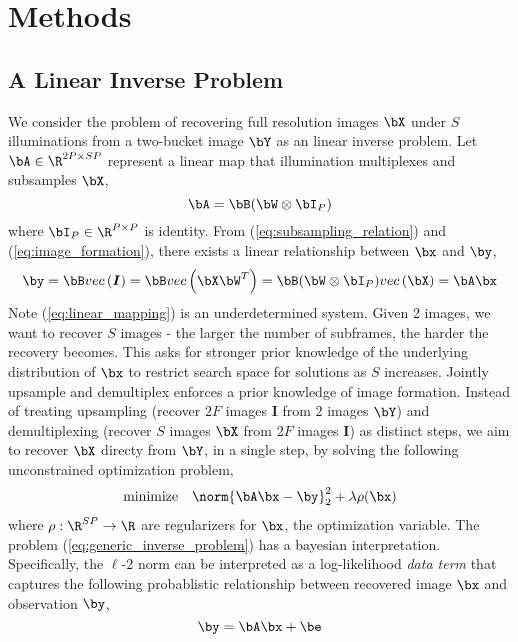 \documentclass[11pt]{article}
\renewcommand{\vec}[1]{vec\left(#1\right)}
\renewcommand{\sI}{\boldsymbol{I}}
\newcommand{\minimize}{\text{minimize}\quad}
\begin{document}
\section{Methods}

\subsection{A Linear Inverse Problem}

We consider the problem of recovering full resolution images $\bX$ under $S$ illuminations from a two-bucket image $\bY$ as an linear inverse problem. Let $\bA \in \R^{2P\times SP}$ represent a linear map that illumination multiplexes and subsamples $\bX$,
\[
    \bA = \bB(\bW\otimes \bI_P)
\]
where $\bI_P\in\R^{P\times P}$ is identity. From (\ref{eq:subsampling_relation}) and (\ref{eq:image_formation}), there exists a linear relationship between $\bx$ and $\by$,
\begin{equation}
    \label{eq:linear_mapping}
    \by = \bB \vec{\sI} = \bB \vec{\bX \bW^T} = \bB(\bW \otimes \bI_P) \vec{\bX} = \bA\bx
\end{equation}
Note (\ref{eq:linear_mapping}) is an underdetermined system. Given 2 images, we want to recover $S$ images - the larger the number of subframes, the harder the recovery becomes. This asks for stronger prior knowledge of the underlying distribution of $\bx$ to restrict search space for solutions as $S$ increases. Jointly upsample and demultiplex enforces a prior knowledge of image formation. Instead of treating upsampling (recover $2F$ images $\sI$ from $2$ images $\bY$) and demultiplexing (recover $S$ images $\bX$ from $2F$ images $\sI$) as distinct steps, we aim to recover $\bX$ directy from $\bY$, in a single step, by solving the following unconstrained optimization problem,
\begin{equation}
    \label{eq:generic_inverse_problem}
    \begin{aligned}
        \minimize & \norm{\bA\bx - \by}_2^2 + \lambda\rho(\bx) \\
    \end{aligned}
\end{equation}
where $\rho:\R^{SP}\to\R$ are regularizers for $\bx$, the optimization variable. The problem (\ref{eq:generic_inverse_problem}) has a bayesian interpretation. Specifically, the $\ell$-2 norm can be interpreted as a log-likelihood \textit{data term} that captures the following probablistic relationship between recovered image $\bx$ and observation $\by$, 
\[
    \by = \bA\bx + \be    
\]
\end{document}
